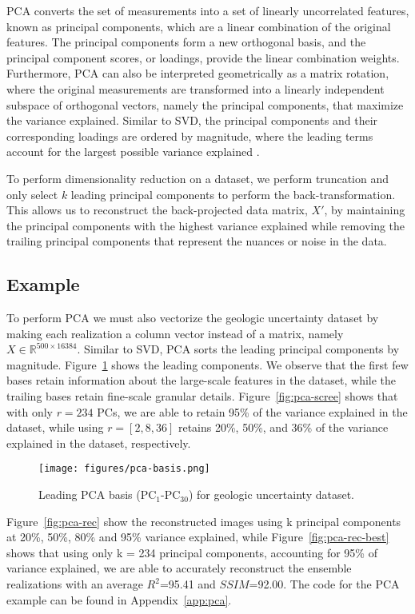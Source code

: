 \documentclass[a4paper,fleqn,12pt]{article}
\begin{document}
PCA converts the set of measurements into a set of linearly uncorrelated features, known as principal components, which are a linear combination of the original features. The principal components form a new orthogonal basis, and the principal component scores, or loadings, provide the linear combination weights. Furthermore, PCA can also be interpreted geometrically as a matrix rotation, where the original measurements are transformed into a linearly independent subspace of orthogonal vectors, namely the principal components, that maximize the variance explained. Similar to SVD, the principal components and their corresponding loadings are ordered by magnitude, where the leading terms account for the largest possible variance explained \cite{esbensen20202}. 

To perform dimensionality reduction on a dataset, we perform truncation and only select $k$ leading principal components to perform the back-transformation. This allows us to reconstruct the back-projected data matrix, $X'$, by maintaining the principal components with the highest variance explained while removing the trailing principal components that represent the nuances or noise in the data.


\subsection*{Example}
To perform PCA we must also vectorize the geologic uncertainty dataset by making each realization a column vector instead of a matrix, namely $X\in\mathbb{R}^{500\times16384}$. Similar to SVD, PCA sorts the leading principal components by magnitude. Figure~\ref{fig:pca-basis} shows the leading components. We observe that the first few bases retain information about the large-scale features in the dataset, while the trailing bases retain fine-scale granular details. Figure~\ref{fig:pca-scree} shows that with only $r=234$ PCs, we are able to retain 95\% of the variance explained in the dataset, while using $r=[2,8,36]$ retains 20\%, 50\%, and 36\% of the variance explained in the dataset, respectively.

\begin{figure}[H]
    \centering
    \texttt{[image: figures/pca-basis.png]}
    \caption{Leading PCA basis (PC$_1$-PC$_{30}$) for geologic uncertainty dataset.}
    \label{fig:pca-basis}
\end{figure}

Figure~\ref{fig:pca-rec} show the reconstructed images using k principal components at 20\%, 50\%, 80\% and 95\% variance explained, while Figure~\ref{fig:pca-rec-best} shows that using only k = 234 principal components, accounting for 95\% of
variance explained, we are able to accurately reconstruct the ensemble realizations with an average $R^2$=95.41 and $SSIM$=92.00. The code for the PCA example can be found in Appendix~\ref{app:pca}.
\end{document}

